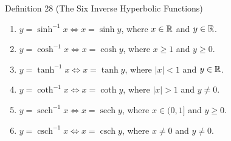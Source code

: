 \begin{definitionbox}{Definition 28 (The Six Inverse Hyperbolic Functions)}
\begin{enumerate}
    \item \(y = \sinh^{-1} x \iff x = \sinh y\), where \(x \in \mathbb{R}\) and \(y \in \mathbb{R}\).
    \item \(y = \cosh^{-1} x \iff x = \cosh y\), where \(x \ge 1\) and \(y \ge 0\).
    \item \(y = \tanh^{-1} x \iff x = \tanh y\), where \(|x| < 1\) and \(y \in \mathbb{R}\).
    \item \(y = \coth^{-1} x \iff x = \coth y\), where \(|x| > 1\) and \(y \neq 0\).
    \item \(y = \operatorname{sech}^{-1} x \iff x = \operatorname{sech} y\), where \(x \in (0, 1]\) and \(y \ge 0\).
    \item \(y = \operatorname{csch}^{-1} x \iff x = \operatorname{csch} y\), where \(x \neq 0\) and \(y \neq 0\).
\end{enumerate}
\end{definitionbox}

